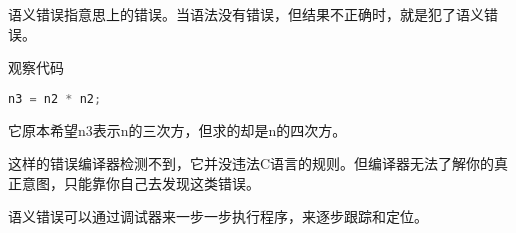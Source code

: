 \begin{frame}[fragile]
\begin{dingyi}
语义错误指意思上的错误。当语法没有错误，但结果不正确时，就是犯了语义错误。
\end{dingyi}\pause 

观察代码
\begin{lstlisting}[language=c,frame=tb]
n3 = n2 * n2;
\end{lstlisting}
它原本希望n3表示n的三次方，但求的却是n的四次方。\pause \vspace{0.1in}


这样的错误编译器检测不到，它并没违法C语言的规则。但编译器无法了解你的真正意图，只能靠你自己去发现这类错误。
\end{frame}


\begin{frame}[fragile]
语义错误可以通过调试器来一步一步执行程序，来逐步跟踪和定位。
\end{frame}

